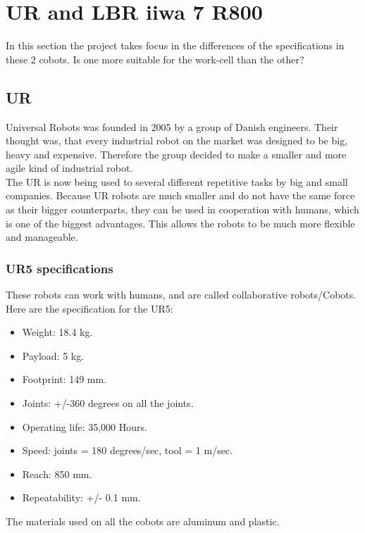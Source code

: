 \section{UR and LBR iiwa 7 R800} \label{ch:UR}

In this section the project takes focus in the differences of the specifications in these 2 cobots. Is one more suitable for the work-cell than the other?

\subsection{UR}

Universal Robots was founded in 2005 by a group of Danish engineers. Their thought was, that every industrial robot on the market was designed to be big, heavy and expensive. Therefore the group decided to make a smaller and more agile kind of industrial robot.\cite{Urhist}\\


The UR is now being used to several different repetitive tasks by big and small companies.
Because UR robots are much smaller and do not have the same force as their bigger counterparts, they can be used in cooperation with humans, which is one of the biggest advantages. This allows the robots to be much more flexible and manageable.\\


\subsubsection{UR5 specifications}

These robots can work with humans, and are called collaborative robots/Cobots.\\
Here are the specification for the UR5:\\ 
\begin{itemize}
    \item Weight: 18.4 kg.
    \item Payload: 5 kg.
    \item Footprint: 149 mm.
    \item Joints: +/-360 degrees on all the joints.
    \item Operating life: 35,000 Hours.
    \item Speed: joints = 180 degrees/sec, tool = 1 m/sec.
    \item Reach: 850 mm.
    \item Repeatability: +/- 0.1 mm.
\end{itemize}
The materials used on all the cobots are aluminum and plastic\cite{Ur5_about}\cite{UR5_tech}.


